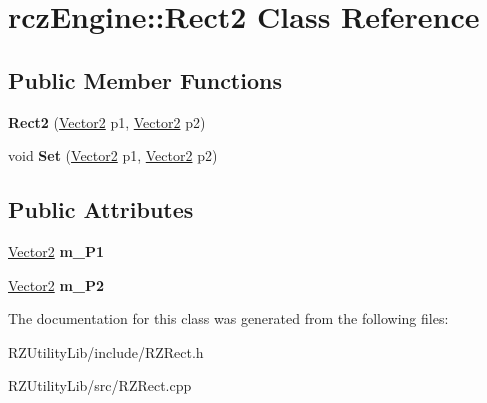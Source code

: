 \hypertarget{classrcz_engine_1_1_rect2}{}\section{rcz\+Engine\+:\+:Rect2 Class Reference}
\label{classrcz_engine_1_1_rect2}
\subsection*{Public Member Functions}
\begin{DoxyCompactItemize}
\item 
\hypertarget{classrcz_engine_1_1_rect2_a8eebe0f1f787ffbd3db6b266456d20f7}{}{\bfseries Rect2} (\hyperlink{classrcz_engine_1_1_vector2}{Vector2} p1, \hyperlink{classrcz_engine_1_1_vector2}{Vector2} p2)\label{classrcz_engine_1_1_rect2_a8eebe0f1f787ffbd3db6b266456d20f7}

\item 
\hypertarget{classrcz_engine_1_1_rect2_a144a561c0844c97adab8777838d4840a}{}void {\bfseries Set} (\hyperlink{classrcz_engine_1_1_vector2}{Vector2} p1, \hyperlink{classrcz_engine_1_1_vector2}{Vector2} p2)\label{classrcz_engine_1_1_rect2_a144a561c0844c97adab8777838d4840a}

\end{DoxyCompactItemize}
\subsection*{Public Attributes}
\begin{DoxyCompactItemize}
\item 
\hypertarget{classrcz_engine_1_1_rect2_af23da0fea376d15c7ff104b5cf527a93}{}\hyperlink{classrcz_engine_1_1_vector2}{Vector2} {\bfseries m\+\_\+\+P1}\label{classrcz_engine_1_1_rect2_af23da0fea376d15c7ff104b5cf527a93}

\item 
\hypertarget{classrcz_engine_1_1_rect2_aac8031afd43400d595442602a230c3a8}{}\hyperlink{classrcz_engine_1_1_vector2}{Vector2} {\bfseries m\+\_\+\+P2}\label{classrcz_engine_1_1_rect2_aac8031afd43400d595442602a230c3a8}

\end{DoxyCompactItemize}


The documentation for this class was generated from the following files\+:\begin{DoxyCompactItemize}
\item 
R\+Z\+Utility\+Lib/include/R\+Z\+Rect.\+h\item 
R\+Z\+Utility\+Lib/src/R\+Z\+Rect.\+cpp\end{DoxyCompactItemize}
